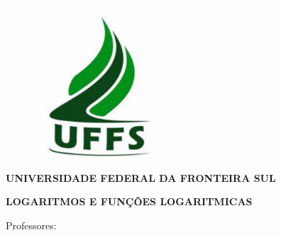 \documentclass[12pt]{article}
\begin{document}

\begin{figure}[H]
	\begin{Center}
		\includegraphics[width=1.92in,height=2.24in]{./media/image1.pdf}
	\end{Center}
\end{figure}



\par

\begin{Center}
{\fontsize{18pt}{21.6pt}\selectfont \textbf{UNIVERSIDADE FEDERAL DA FRONTEIRA SUL}\par}
\end{Center}\par


\vspace{\baselineskip}

\vspace{\baselineskip}

\vspace{\baselineskip}

\vspace{\baselineskip}

\vspace{\baselineskip}

\vspace{\baselineskip}
\begin{Center}
{\fontsize{24pt}{28.8pt}\selectfont \textbf{LOGARITMOS E FUNÇÕES LOGARITMICAS}\par}
\end{Center}\par


\vspace{\baselineskip}
\begin{Center}
{\fontsize{16pt}{19.2pt}\selectfont Professores:\par}
\end{Center}\par
\end{document}
